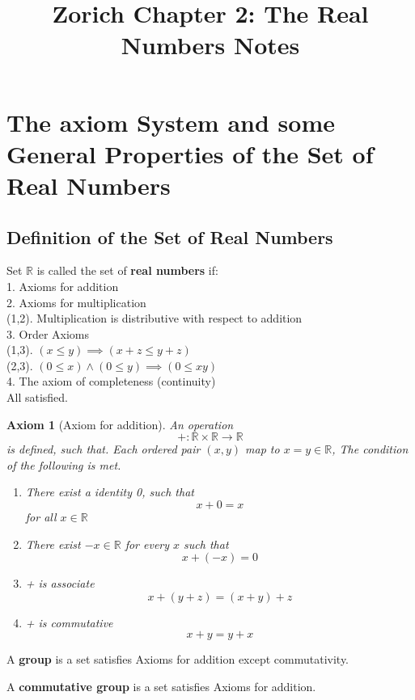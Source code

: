 \documentclass[letter]{article}
\title{Zorich Chapter 2: The Real Numbers Notes}
\date{}
\newcommand{\R}{\mathbb{R}}
\newenvironment{definition}[1][Definition]{\begin{trivlist}
\item[\hskip \labelsep {\bfseries #1}]}{\end{trivlist}}
\begin{document}
\maketitle
\vspace{-.5in}
\section{The axiom System and some General Properties of the Set of Real Numbers}
\subsection{Definition of the Set of Real Numbers}
\newtheorem{axi}{Axiom}
\begin{definition}
Set $\R$ is called the set of \textbf{real numbers} if:\\
1. Axioms for addition\\
2. Axioms for multiplication\\
(1,2). Multiplication is distributive with respect to addition\\
3. Order Axioms\\
(1,3). $(x\leq y) \implies (x+z\leq y+z)$\\ 
(2,3). $(0\leq x) \wedge (0\leq y) \implies (0\leq xy)$\\
4. The axiom of completeness (continuity)\\
All satisfied.
\end{definition}

\begin{axi}[Axiom for addition]
An operation
\[ +: \R \times \R \to \R \]
is defined, such that.
Each ordered pair $(x,y)$ map to $x=y \in \R$, The condition of the following is met.
\begin{enumerate}
\item There exist a identity 0, such that
\[
x+0 = x
\]
for all $x \in \R$
\item There exist $-x\in \R$ for every $x$ such that
\[ 
x+(-x) = 0
\]
\item + is associate 
\[
x+(y+z) = (x+y)+z
\]
\item + is commutative
\[
x+y = y+x
\]
\end{enumerate}
\end{axi}

\begin{definition}
A \textbf{group} is a set satisfies Axioms for addition except commutativity.
\end{definition}

\begin{definition}
A \textbf{commutative group} is a set satisfies Axioms for addition.
\end{definition}
\end{document}
